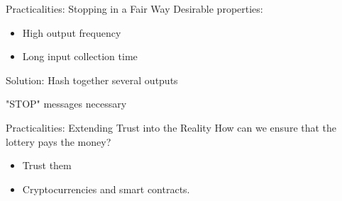\begin{frame}{Practicalities: Stopping in a Fair Way}
    Desirable properties:
    \begin{itemize}
        \item High output frequency
        \item Long input collection time
    \end{itemize}

    Solution: Hash together several outputs

    "STOP" messages necessary

\end{frame}

\begin{frame}{Practicalities: Extending Trust into the Reality}
    How can we ensure that the lottery pays the money?
    \begin{itemize}
        \item Trust them
        \item Cryptocurrencies and smart contracts.
    \end{itemize}
\end{frame}
